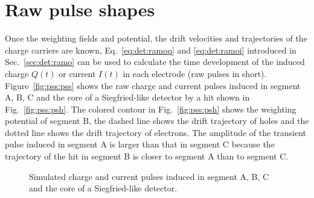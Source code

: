 \section{Raw pulse shapes}
\label{sec:pss:ps}
Once the weighting fields and potential, the drift velocities and trajectories of the charge carriers are known, Eq.~\ref{eq:det:ramoq} and \ref{eq:det:ramoi} introduced in Sec.~\ref{sec:det:ramo} can be used to calculate the time development of the induced charge $Q(t)$ or current $I(t)$ in each electrode (raw pulses in short). Figure~\ref{fig:pss:pss} shows the raw charge and current pulses induced in segment A, B, C and the core of a Siegfried-like detector by a hit shown in Fig.~\ref{fig:pss:psh}. The colored contour in Fig.~\ref{fig:pss:psh} shows the weighting potential of segment B, the dashed line shows the drift trajectory of holes and the dotted line shows the drift trajectory of electrons. The amplitude of the transient pulse induced in segment A is larger than that in segment C because the trajectory of the hit in segment B is closer to segment A than to segment C.
\begin{figure}[htbp]
\centering
{}%
%
\caption{Simulated charge and current pulses induced in segment A, B, C and the core of a Siegfried-like detector.}
\label{fig:pss:ps}
\end{figure}


